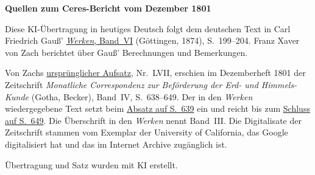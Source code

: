 \clearpage\thispagestyle{empty}
\begin{center}\textbf{Quellen zum Ceres-Bericht vom Dezember 1801}\end{center}
\noindent Diese KI-Übertragung in heutiges Deutsch folgt dem deutschen Text in Carl Friedrich Gauß’ \href{https://gdz.sub.uni-goettingen.de/id/PPN236007467}{\textit{Werken}, Band~VI} (Göttingen, 1874), S.~199--204. Franz Xaver von Zach berichtet über Gauß’ Berechnungen und Bemerkungen.
\par\smallskip\noindent Von Zachs \href{https://archive.org/download/bub_gb_8mY7AQAAIAAJ/page/n544.jpg}{ursprünglicher Aufsatz}, Nr.~LVII, erschien im Dezemberheft 1801 der Zeitschrift \textit{Monatliche Correspondenz zur Beförderung der Erd- und Himmels-Kunde} (Gotha, Becker), Band~IV, S.~638--649. Der in den \textit{Werken} wiedergegebene Text setzt beim \href{https://archive.org/download/bub_gb_8mY7AQAAIAAJ/page/n545.jpg}{Absatz auf S.~639} ein und reicht bis zum \href{https://archive.org/download/bub_gb_8mY7AQAAIAAJ/page/n555.jpg}{Schluss auf S.~649}. Die Überschrift in den \textit{Werken} nennt Band~III. Die Digitalisate der Zeitschrift stammen vom Exemplar der University of California, das Google digitalisiert hat und das im Internet Archive zugänglich ist.
\par\smallskip\noindent Übertragung und Satz wurden mit KI erstellt.
\clearpage
